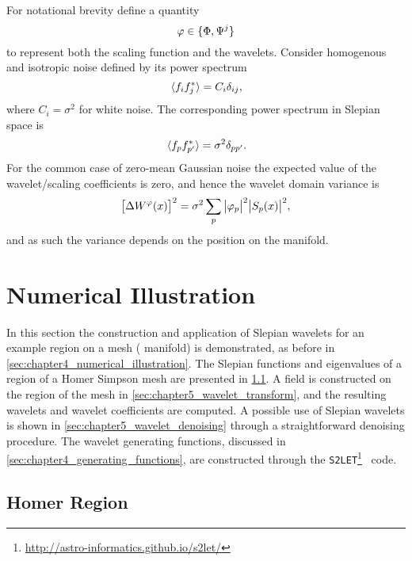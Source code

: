 For notational brevity define a quantity
%
\begin{equation}
	\varphi \in \set{\Phi,\Psi^{j}}
\end{equation}
%
to represent both the scaling function and the wavelets.
Consider homogenous and isotropic noise defined by its power spectrum
%
\begin{equation}
	\expval*{f_{i} \conj{f_{j}}}
	= C_{i} \delta_{i j},
\end{equation}
%
where \(C_{i} = \sigma^{2}\) for white noise.
The corresponding power spectrum in Slepian space is
%
\begin{equation}
	\expval*{\slepian{f} \conj{\slepian[']{f}}}
	= \sigma^{2} \delta_{pp'}.
\end{equation}
%
For the common case of zero-mean Gaussian noise the expected value of the wavelet/scaling coefficients is zero, and hence the wavelet domain variance is
%
\begin{equation}
	\variance{\mesh{W^{\varphi}}}
	= \sigma^{2} \slepianSum \abs{\slepian{\varphi}}^{2} \abs{\mesh{\slepian{S}}}^{2},
\end{equation}
%
and as such the variance depends on the position on the manifold.

\section{Numerical Illustration}\label{sec:chapter5_numerical_illustration}

In this section the construction and application of Slepian wavelets for an example region on a mesh (\cf{} manifold) is demonstrated, as before in \cref{sec:chapter4_numerical_illustration}.
The Slepian functions and eigenvalues of a region of a Homer Simpson mesh are presented in \cref{sec:chapter5_homer_region}.
A field is constructed on the region of the mesh in \cref{sec:chapter5_wavelet_transform}, and the resulting wavelets and wavelet coefficients are computed.
A possible use of Slepian wavelets is shown in \cref{sec:chapter5_wavelet_denoising} through a straightforward denoising procedure.
The wavelet generating functions, discussed in \cref{sec:chapter4_generating_functions}, are constructed through the \texttt{S2LET}\footnote{\url{http://astro-informatics.github.io/s2let/}}~\cite{Leistedt2013} code.

\subsection{Homer Region}\label{sec:chapter5_homer_region}

